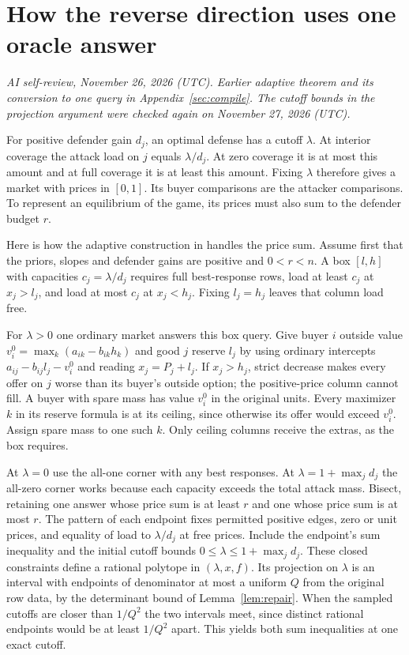 \documentclass[11pt,oneside,openany,notitlepage]{report}
\newcommand{\reviewdate}{November 26, 2026 (UTC)}
\newcommand{\reviewmark}[1]{\par\nopagebreak[4]\noindent
  {\footnotesize\itshape AI self-review, \reviewdate. #1\par}\nobreak\smallskip}
\begin{document}
\section{How the reverse direction uses one oracle answer}
\reviewmark{Earlier adaptive theorem and its conversion to one query in Appendix~\ref{sec:compile}. The cutoff bounds in the projection argument were checked again on November 27, 2026 (UTC).}

For positive defender gain \(d_j\), an optimal defense has a cutoff
\(\lambda\). At interior coverage the attack load on \(j\) equals
\(\lambda/d_j\). At zero coverage it is at most this amount and at full
coverage it is at least this amount. Fixing \(\lambda\) therefore gives
a market with prices in \([0,1]\). Its buyer comparisons are the
attacker comparisons. To represent an equilibrium of the game, its prices
must also sum to the defender budget \(r\).

Here is how the adaptive construction in \cite[Theorem~3.1]{book} handles
the price sum. Assume first that the priors, slopes and defender gains are
positive and \(0<r<n\). A box \([l,h]\) with capacities
\(c_j=\lambda/d_j\) requires full best-response rows, load at least
\(c_j\) at \(x_j>l_j\), and load at most \(c_j\) at \(x_j<h_j\).
Fixing \(l_j=h_j\) leaves that column load free.

For \(\lambda>0\) one ordinary market answers this box query. Give buyer
\(i\) outside value \(v_i^0=\max_k(a_{ik}-b_{ik}h_k)\) and good \(j\)
reserve \(l_j\) by using ordinary intercepts
\(a_{ij}-b_{ij}l_j-v_i^0\) and reading \(x_j=P_j+l_j\).
If \(x_j>h_j\), strict decrease makes every offer on \(j\) worse than
its buyer's outside option; the positive-price column cannot fill.
A buyer with spare mass has value \(v_i^0\) in the original units.
Every maximizer \(k\) in its reserve formula is at its ceiling, since
otherwise its offer would exceed \(v_i^0\). Assign spare mass to one
such \(k\). Only ceiling columns receive the extras, as the box requires.

At \(\lambda=0\) use the all-one corner with any best responses. At
\(\lambda=1+\max_jd_j\) the all-zero corner works because each
capacity exceeds the total attack mass. Bisect, retaining one answer
whose price sum is at least \(r\) and one whose price sum is at most
\(r\). The pattern of each endpoint fixes permitted positive edges,
zero or unit prices, and equality of load to \(\lambda/d_j\) at free
prices. Include the endpoint's sum inequality and the initial cutoff bounds
\(0\le\lambda\le1+\max_jd_j\). These closed constraints define a rational
polytope in \((\lambda,x,f)\). Its projection on \(\lambda\) is an
interval with endpoints of denominator at most a uniform \(Q\) from
the original row data, by the determinant bound of Lemma~\ref{lem:repair}.
When the sampled cutoffs are closer than \(1/Q^2\) the two intervals
meet, since distinct rational endpoints would be at least \(1/Q^2\)
apart. This yields both sum inequalities at one exact cutoff.
\end{document}
